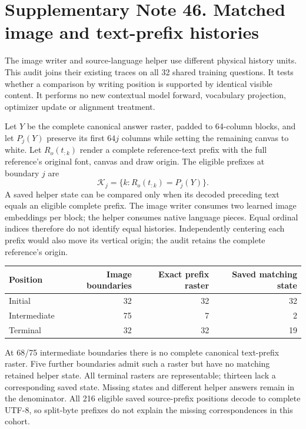 \clearpage
\section*{Supplementary Note 46. Matched image and text-prefix histories}

The image writer and source-language helper use different physical history
units. This audit joins their existing traces on all 32 shared training
questions. It tests whether a comparison by writing position is supported
by identical visible content. It performs no new contextual model forward,
vocabulary projection, optimizer update or alignment treatment.

Let $Y$ be the complete canonical answer raster, padded to 64-column blocks,
and let $P_j(Y)$ preserve its first $64j$ columns while setting the remaining
canvas to white. Let $R_o(t_{:k})$ render a complete reference-text prefix
with the full reference's original font, canvas and draw origin. The
eligible prefixes at boundary $j$ are
\[
 \mathcal K_j=\{k:R_o(t_{:k})=P_j(Y)\}.
\]
A saved helper state can be compared only when its decoded preceding text
equals an eligible complete prefix. The image writer consumes two learned
image embeddings per block; the helper consumes native language pieces.
Equal ordinal indices therefore do not identify equal histories.
Independently centering each prefix would also move its vertical origin;
the audit retains the complete reference's origin.

\begin{center}\small
\begin{tabular}{lrrr}
\toprule
Position & Image boundaries & Exact prefix raster & Saved matching state\\
\midrule
Initial & 32 & 32 & 32\\
Intermediate & 75 & 7 & 2\\
Terminal & 32 & 32 & 19\\
\bottomrule
\end{tabular}
\end{center}
At 68/75 intermediate boundaries there is no complete canonical text-prefix
raster. Five further boundaries admit such a raster but have no matching
retained helper state. All terminal rasters are representable; thirteen
lack a corresponding saved state. Missing states and different helper
answers remain in the denominator. All 216 eligible saved source-prefix
positions decode to complete UTF-8, so split-byte prefixes do not explain
the missing correspondences in this cohort.

